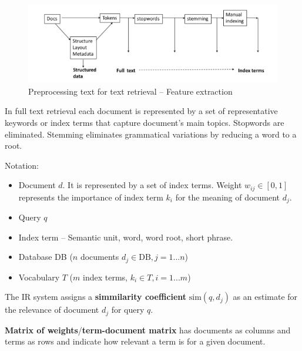     \begin{figure}[htp]
      \centering
        \includegraphics[width=\textwidth]{images/preptextfe.png}
        \caption{Preprocessing text for text retrieval -- Feature extraction}
        \label{fig:preptextfe}
    \end{figure}

\newpage
  In full text retrieval each document is represented by a set of representative keywords or index terms that capture document's main topics. Stopwords are eliminated. Stemming eliminates grammatical variations by reducing a word to a root.

  Notation:
  \begin{itemize}
    \item Document $d$. It is represented by a set of index terms. Weight $w_{ij}\in [0,1]$ represents the importance of index term $k_i$ for the meaning of document $d_j$.
    \item Query $q$
    \item Index term -- Semantic unit, word, word root, short phrase.
    \item Database DB ($n$ documents $d_j\in \text{DB},j=1...n $)
    \item Vocabulary $T$ ($m$ index terms, $k_i\in T, i=1...m$)
  \end{itemize}
  The IR system assigns a \textbf{simmilarity coefficient} $\text{sim}(q, d_j)$ as an estimate for the relevance of document $d_j$ for query $q$.

  \textbf{Matrix of weights}/\textbf{term-document matrix} has documents as columns and terms as rows and indicate how relevant a term is for a given document.

